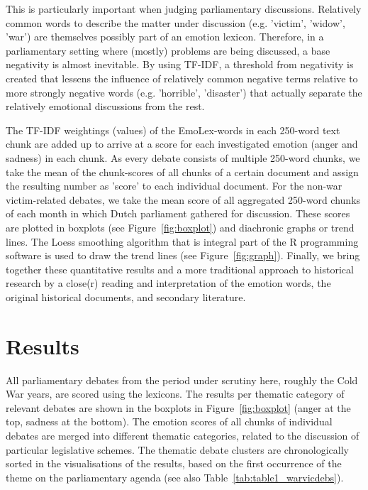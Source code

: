\documentclass{dhbenelux}
\begin{document}
This is particularly important when judging parliamentary discussions. Relatively common words to describe the matter under discussion (e.g. 'victim', 'widow', 'war') are themselves possibly part of an emotion lexicon. Therefore, in a parliamentary setting where (mostly) problems are being discussed, a base negativity is almost inevitable. By using TF-IDF, a threshold from negativity is created that lessens the influence of relatively common negative terms relative to more strongly negative words (e.g. 'horrible', 'disaster') that actually separate the relatively emotional discussions from the rest.

The TF-IDF weightings (values) of the EmoLex-words in each 250-word text chunk are added up to arrive at a score for each investigated emotion (anger and sadness) in each chunk. As every debate consists of multiple 250-word chunks, we take the mean of the chunk-scores of all chunks of a certain document and assign the resulting number as 'score' to each individual document. For the non-war victim-related debates, we take the mean score of all aggregated 250-word chunks of each month in which Dutch parliament gathered for discussion. These scores are plotted in boxplots (see 
Figure~\ref{fig:boxplot})
and diachronic graphs or trend lines. The Loess smoothing algorithm that is integral part of the R programming software \citep{r_core_team_r_2019} is used to draw the trend lines
(see Figure~\ref{fig:graph}). 
Finally, we bring together these quantitative results and a more traditional approach to historical research by a close(r) reading and interpretation of the emotion words, the original historical documents, and secondary literature.

\section{Results}



All parliamentary debates from the period under scrutiny here, roughly the Cold War years, are scored using the lexicons. The results per thematic category of relevant debates are shown in the boxplots in Figure~\ref{fig:boxplot} (anger at the top, sadness at the bottom). 
The emotion scores of all chunks of individual debates are merged into different thematic categories, related to the discussion of particular legislative schemes. The thematic debate clusters are chronologically sorted in the visualisations of the results, based on the first occurrence of the theme on the parliamentary agenda (see also Table~\ref{tab:table1_warvicdebs}).
\end{document}
